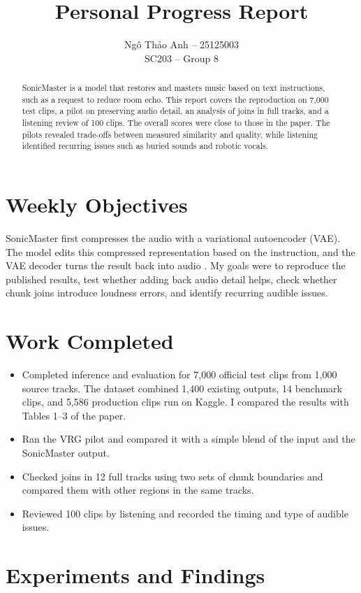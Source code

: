 \documentclass[12pt,a4paper]{article}
\title{\textbf{Personal Progress Report}}
\author{{\fontencoding{T5}\selectfont Ngô Thảo Anh} -- 25125003\\
\small SC203 -- Group 8}
\date{}
\begin{document}
\maketitle

\begin{abstract}
\noindent SonicMaster is a model that restores and masters music based on text instructions, such as a request to reduce room echo. This report covers the reproduction on 7,000 test clips, a pilot on preserving audio detail, an analysis of joins in full tracks, and a listening review of 100 clips. The overall scores were close to those in the paper. The pilots revealed trade-offs between measured similarity and quality, while listening identified recurring issues such as buried sounds and robotic vocals.
\end{abstract}

\section{Weekly Objectives}
SonicMaster first compresses the audio with a variational autoencoder (VAE). The model edits this compressed representation based on the instruction, and the VAE decoder turns the result back into audio \cite{sonicmaster}. My goals were to reproduce the published results, test whether adding back audio detail helps, check whether chunk joins introduce loudness errors, and identify recurring audible issues.

\section{Work Completed}
\begin{itemize}
  \item Completed inference and evaluation for 7,000 official test clips from 1,000 source tracks. The dataset combined 1,400 existing outputs, 14 benchmark clips, and 5,586 production clips run on Kaggle. I compared the results with Tables 1--3 of the paper.
  \item Ran the VRG pilot and compared it with a simple blend of the input and the SonicMaster output.
  \item Checked joins in 12 full tracks using two sets of chunk boundaries and compared them with other regions in the same tracks.
  \item Reviewed 100 clips by listening and recorded the timing and type of audible issues.
\end{itemize}

\section{Experiments and Findings}
\end{document}

